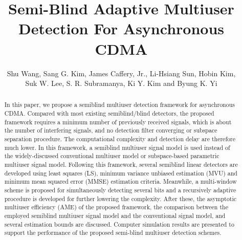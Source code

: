 \documentclass[a4paper,10pt,fleqn, twocolumn]{IEEETran}
\title{ Semi-Blind Adaptive Multiuser Detection For Asynchronous CDMA }
\date{}
\author{Shu Wang, Sang G. Kim, James Caffery, Jr., Li-Hsiang Sun, Hobin Kim,\\Suk W. Lee, S. R. Subramanya, Ki Y. Kim and Byung K. Yi}
\begin{document}
\maketitle
\begin{abstract}\small
In this paper, we propose a semiblind multiuser detection
framework for asynchronous CDMA. Compared with most existing
semiblind/blind detectors, the proposed framework requires a
minimum number of previously received signals, which is about the
number of interfering signals, and no detection filter converging
or subspace separation procedure. The computational complexity and
detection delay are therefore much lower. In this framework, a
semiblind multiuser signal model is used instead of the
widely-discussed conventional multiuser model or subspace-based
parametric multiuser signal model. Following this framework,
several semiblind linear detectors are developed using least
squares (LS), minimum variance unbiased estimation (MVU) and
minimum mean squared error (MMSE) estimation criteria. Meanwhile,
a multi-window scheme is proposed for simultaneously detecting
several bits and a recursively adaptive procedure is developed for
further lowering the complexity. After these, the asymptotic
multiuser efficiency (AME) of the proposed framework, the
comparison between the employed semiblind multiuser signal model
and the conventional signal model, and several estimation bounds
are discussed. Computer simulation results are presented to
support the performance of the proposed semi-blind multiuser
detection schemes.
\end{abstract}
\end{document}
